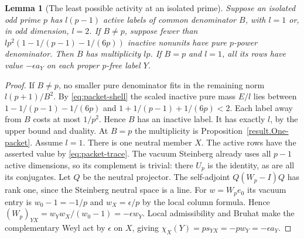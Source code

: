 \documentclass[11pt]{amsart}
\numberwithin{equation}{section}
\newtheorem{lemma}[theorem]{Lemma}
\theoremstyle{definition}
\theoremstyle{plain}
\begin{document}
\begin{lemma}[The least possible activity at an isolated prime]\label{result:packet-idempotent}
Suppose an isolated odd prime $p$ has $l(p-1)$ active labels of
common denominator $B$, with $l=1$ or, in odd dimension, $l=2$.
If $B\ne p$, suppose fewer than $lp^2(1-1/(p-1)-1/(6p))$ inactive
nonunits have pure $p$-power denominator. Then $B$ has multiplicity
$lp$. If $B=p$ and $l=1$, all its rows have value $-\epsilon a_Y$
on each proper $p$-free label $Y$.
\end{lemma}
\begin{proof}
If $B\ne p$, no smaller pure denominator fits in the remaining norm
$l(p+1)/B^2$. By \eqref{eq:packet-shell} the scaled inactive pure mass
$E/l$ lies between $1-1/(p-1)-1/(6p)$ and $1+1/(p-1)+1/(6p)<2$.
Each label away from $B$ costs at most $1/p^2$. Hence $B$ has an
inactive label. It has exactly $l$, by the upper bound and duality.
At $B=p$ the multiplicity is Proposition~\ref{result.One-packet}.
Assume $l=1$. There is one neutral
member $X$. The active rows have the asserted value by
\eqref{eq:packet-trace}. The vacuum Steinberg already uses all
$p-1$ active dimensions, so its complement is trivial: there $U_p$
is the identity, as are all its conjugates. Let $Q$ be the neutral
projector. The self-adjoint $Q(W_p-I)Q$ has rank one, since the
Steinberg neutral space is a line. For $w=W_pe_0$ its vacuum
entry is $w_0-1=-1/p$ and $w_X=\epsilon/p$ by the local column
formula. Hence $(W_p)_{YX}=w_Yw_X/(w_0-1)=-\epsilon w_Y$.
Local admissibility and Bruhat make the complementary Weyl act by $\epsilon$ on $X$, giving
$\chi_X(Y)=p s_{YX}=-p w_Y=-\epsilon a_Y$.
\end{proof}
\end{document}
